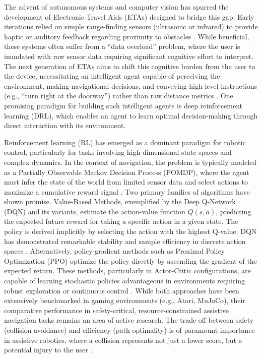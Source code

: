 \documentclass{article}
\begin{document}
The advent of autonomous systems and computer vision has spurred the development
of Electronic Travel Aids (ETAs) designed to bridge this gap. Early iterations
relied on simple range-finding sensors (ultrasonic or infrared) to provide haptic
or auditory feedback regarding proximity to obstacles \cite{plikynas2020}. While
beneficial, these systems often suffer from a ``data overload'' problem, where the
user is inundated with raw sensor data requiring significant cognitive effort to
interpret. The next generation of ETAs aims to shift this cognitive burden from
the user to the device, necessitating an intelligent agent capable of perceiving
the environment, making navigational decisions, and conveying high-level
instructions (e.g., ``turn right at the doorway'') rather than raw distance
metrics \cite{srinivasaiah2024}. One promising paradigm for building such
intelligent agents is deep reinforcement learning (DRL), which enables an agent
to learn optimal decision-making through direct interaction with its environment.

Reinforcement learning (RL) has emerged as a dominant paradigm for robotic
control, particularly for tasks involving high-dimensional state spaces and complex
dynamics. In the context of navigation, the problem is typically modeled as a
Partially Observable Markov Decision Process (POMDP), where the agent must infer
the state of the world from limited sensor data and select actions to maximize a
cumulative reward signal \cite{zhu2025}. Two primary families of algorithms have
shown promise. Value-Based Methods, exemplified by the Deep Q-Network (DQN) and
its variants, estimate the action-value function $Q(s,a)$, predicting the expected
future reward for taking a specific action in a given state. The policy is derived
implicitly by selecting the action with the highest Q-value. DQN has demonstrated
remarkable stability and sample efficiency in discrete action spaces
\cite{lafuente2024}. Alternatively, policy-gradient methods such as Proximal
Policy Optimization (PPO) optimize the policy directly by ascending the gradient
of the expected return. These methods, particularly in Actor-Critic configurations,
are capable of learning stochastic policies advantageous in environments requiring
robust exploration or continuous control \cite{tan2025}. While both approaches have
been extensively benchmarked in gaming environments (e.g., Atari, MuJoCo), their
comparative performance in safety-critical, resource-constrained assistive
navigation tasks remains an area of active research. The trade-off between safety
(collision avoidance) and efficiency (path optimality) is of paramount importance
in assistive robotics, where a collision represents not just a lower score, but a
potential injury to the user \cite{hsu2021}.
\end{document}
